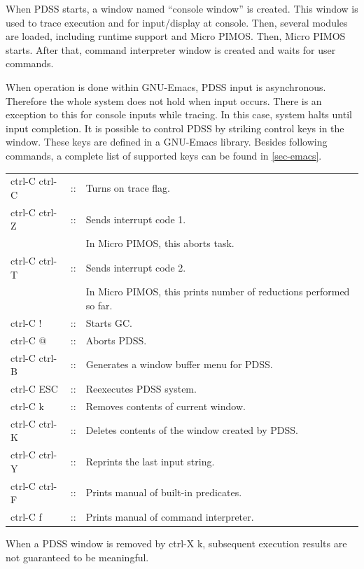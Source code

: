When PDSS starts, a window named ``console window'' is created.
This window is used to trace execution and for input/display at console.
Then, several modules are loaded, including runtime support and Micro PIMOS.
Then, Micro PIMOS starts.
After that, command interpreter window is created and waits for user commands.

When operation is done within GNU-Emacs, PDSS input is asynchronous.
Therefore the whole system does not hold when input occurs.
There is an exception to this for console inputs while tracing.
In this case, system halts until input completion.
It is possible to control PDSS by striking control keys in the window.
These keys are defined in a GNU-Emacs library. Besides following commands,
a complete list of supported keys can be found in \ref{sec-emacs}.
\vspace{1ex}

\hspace*{15mm}\begin{tabular}{lcl}
ctrl-C ctrl-C & :: & Turns on trace flag.\\
ctrl-C ctrl-Z & :: & Sends interrupt code 1.\\
              &    & In Micro PIMOS, this aborts task.\\
ctrl-C ctrl-T & :: & Sends interrupt code 2.\\
              &    & In Micro PIMOS, this prints number of reductions
							performed so far.\\
ctrl-C !      & :: & Starts GC.\\
ctrl-C @      & :: & Aborts PDSS.\\
ctrl-C ctrl-B & :: & Generates a window buffer menu for PDSS.\\
ctrl-C ESC    & :: & Reexecutes PDSS system.\\
ctrl-C k      & :: & Removes contents of current window.\\
ctrl-C ctrl-K & :: & Deletes contents of the window created by PDSS.\\
ctrl-C ctrl-Y & :: & Reprints the last input string.\\
ctrl-C ctrl-F & :: & Prints manual of built-in predicates.\\
ctrl-C f   & :: & Prints manual of command interpreter.\\
\end{tabular}
\vspace{1ex}

\Caution When a PDSS window is removed by ctrl-X k, subsequent execution
results are not guaranteed to be meaningful.


